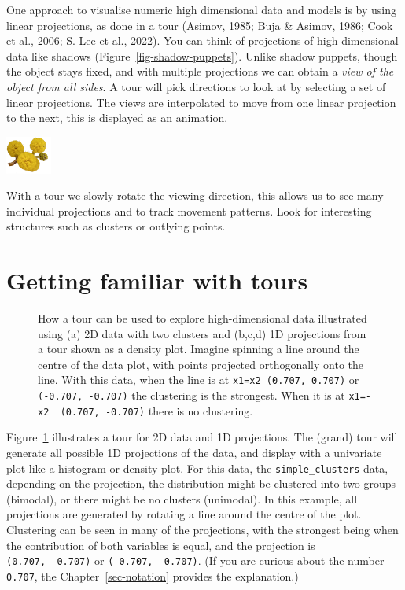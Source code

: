 \documentclass[
  letterpaper,
]{krantz}
\newcommand{\infobox}[1]{%
\noindent\colorbox{info!30}{%
\begin{minipage}{0.98\linewidth}%
    \centering%
    \begin{minipage}[c]{0.15\linewidth} %
      \includegraphics[width=1.5cm]{images/mulga-flowers2.png} %
    \end{minipage}%
    \hfill %
    \begin{minipage}[c]{0.8\linewidth} %
      \bigskip%
      \textsf{#1}%
      \bigskip%
    \end{minipage}%
    \hspace*{3mm}%
  \end{minipage}%
}%
}
\begin{document}
One approach to visualise numeric high dimensional data and models is by
using linear projections, as done in a tour (Asimov, 1985; Buja \&
Asimov, 1986; Cook et al., 2006; S. Lee et al., 2022). You can think of
projections of high-dimensional data like shadows
(Figure~\ref{fig-shadow-puppets}). Unlike shadow puppets, though the
object stays fixed, and with multiple projections we can obtain a
\emph{view of the object from all sides}. A tour will pick directions to
look at by selecting a set of linear projections. The views are
interpolated to move from one linear projection to the next, this is
displayed as an animation.  

\infobox{With a tour we slowly rotate the viewing direction, this allows us to see many individual projections and to track movement patterns. Look for interesting structures such as clusters or outlying points.}

\section{Getting familiar with tours}\label{getting-familiar-with-tours}

\begin{figure}


\caption{\label{fig-explain-1D-pdf}How a tour can be used to explore
high-dimensional data illustrated using (a) 2D data with two clusters
and (b,c,d) 1D projections from a tour shown as a density plot. Imagine
spinning a line around the centre of the data plot, with points
projected orthogonally onto the line. With this data, when the line is
at \texttt{x1=x2\ (0.707,\ 0.707)} or \texttt{(-0.707,\ -0.707)} the
clustering is the strongest. When it is at
\texttt{x1=-x2\ \ (0.707,\ -0.707)} there is no clustering.
}

\end{figure}%

Figure~\ref{fig-explain-1D-pdf} illustrates a tour for 2D data and 1D
projections. The (grand) tour will generate all possible 1D projections
of the data, and display with a univariate plot like a histogram or
density plot. For this data, the \texttt{simple\_clusters} data,
depending on the projection, the distribution might be clustered into
two groups (bimodal), or there might be no clusters (unimodal). In this
example, all projections are generated by rotating a line around the
centre of the plot. Clustering can be seen in many of the projections,
with the strongest being when the contribution of both variables is
equal, and the projection is \texttt{(0.707,\ \ 0.707)} or
\texttt{(-0.707,\ -0.707)}. (If you are curious about the number
\texttt{0.707}, the Chapter~\ref{sec-notation} provides the
explanation.)  
\end{document}
